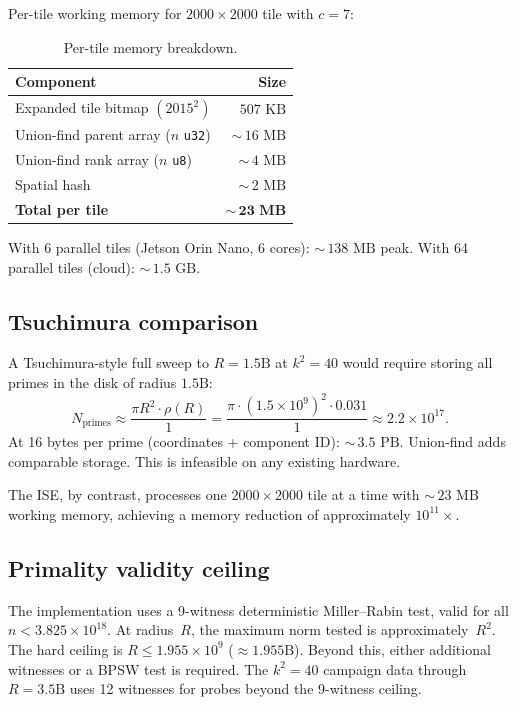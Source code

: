 \documentclass[11pt,a4paper]{article}
\theoremstyle{definition}
\theoremstyle{plain}
\theoremstyle{remark}
\begin{document}
Per-tile working memory for $2000 \times 2000$ tile with $c = 7$:

\begin{table}[ht]
\centering
\begin{tabular}{@{}lr@{}}
\toprule
Component & Size \\
\midrule
Expanded tile bitmap $(2015^2)$            & $507\text{ KB}$ \\
Union-find parent array ($n$ \texttt{u32}) & ${\sim}\,16\text{ MB}$ \\
Union-find rank array ($n$ \texttt{u8})    & ${\sim}\,4\text{ MB}$ \\
Spatial hash                               & ${\sim}\,2\text{ MB}$ \\
\midrule
\textbf{Total per tile}                    & $\mathbf{{\sim}\,23\textbf{ MB}}$ \\
\bottomrule
\end{tabular}
\caption{Per-tile memory breakdown.}
\label{tab:memory}
\end{table}

With 6 parallel tiles (Jetson Orin Nano, 6 cores): ${\sim}\,138\text{ MB}$ peak.  With 64 parallel tiles (cloud): ${\sim}\,1.5\text{ GB}$.

\subsection{Tsuchimura comparison}

A Tsuchimura-style full sweep to $R = 1.5\text{B}$ at $k^2 = 40$ would require storing all primes in the disk of radius $1.5\text{B}$:
\[
  N_{\text{primes}} \approx \frac{\pi R^2 \cdot \rho(R)}{1} = \frac{\pi \cdot (1.5 \times 10^9)^2 \cdot 0.031}{1} \approx 2.2 \times 10^{17}.
\]
At 16 bytes per prime (coordinates + component ID): ${\sim}\,3.5\text{ PB}$.  Union-find adds comparable storage.  This is infeasible on any existing hardware.

The ISE, by contrast, processes one $2000 \times 2000$ tile at a time with ${\sim}\,23\text{ MB}$ working memory, achieving a memory reduction of approximately $10^{11}\times$.

\subsection{Primality validity ceiling}

The implementation uses a 9-witness deterministic Miller--Rabin test, valid for all $n < 3.825 \times 10^{18}$.  At radius~$R$, the maximum norm tested is approximately~$R^2$.  The hard ceiling is $R \le 1.955 \times 10^9$ ($\approx 1.955\text{B}$).  Beyond this, either additional witnesses or a BPSW test is required.  The $k^2 = 40$ campaign data through $R = 3.5\text{B}$ uses 12 witnesses for probes beyond the 9-witness ceiling.
\end{document}

